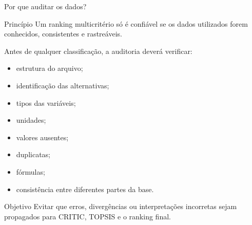 %
%
%
%
%



\begin{frame}{Por que auditar os dados?}

    \begin{block}{Princípio}
        Um ranking multicritério só é confiável se os dados utilizados
        forem conhecidos, consistentes e rastreáveis.
    \end{block}

    \vspace{0.3cm}

    Antes de qualquer classificação, a auditoria deverá verificar:

    \begin{itemize}
        \item estrutura do arquivo;
        \item identificação das alternativas;
        \item tipos das variáveis;
        \item unidades;
        \item valores ausentes;
        \item duplicatas;
        \item fórmulas;
        \item consistência entre diferentes partes da base.
    \end{itemize}

    \vspace{0.2cm}

    \begin{alertblock}{Objetivo}
        Evitar que erros, divergências ou interpretações incorretas
        sejam propagados para CRITIC, TOPSIS e o ranking final.
    \end{alertblock}

\end{frame}


